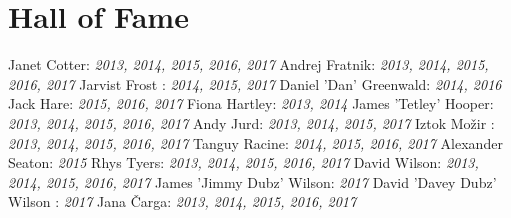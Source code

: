 \section{Hall of Fame} 

Janet Cotter: \textsl{2013, 2014, 2015, 2016, 2017 }
\newline
Andrej Fratnik: \textsl{2013, 2014, 2015, 2016, 2017 }
\newline
Jarvist Frost : \textsl{2014, 2015, 2017 }
\newline
Daniel 'Dan' Greenwald: \textsl{2014, 2016 }
\newline
Jack Hare: \textsl{2015, 2016, 2017 }
\newline
Fiona Hartley: \textsl{2013, 2014 }
\newline
James 'Tetley' Hooper: \textsl{2013, 2014, 2015, 2016, 2017 }
\newline
Andy Jurd: \textsl{2013, 2014, 2015, 2017 }
\newline
Iztok Mo\v{z}ir : \textsl{2013, 2014, 2015, 2016, 2017 }
\newline
Tanguy Racine: \textsl{2014, 2015, 2016, 2017 }
\newline
Alexander Seaton: \textsl{2015 }
\newline
Rhys Tyers: \textsl{2013, 2014, 2015, 2016, 2017 }
\newline
David Wilson: \textsl{2013, 2014, 2015, 2016, 2017 }
\newline
James 'Jimmy Dubz' Wilson: \textsl{2017 }
\newline
David 'Davey Dubz' Wilson : \textsl{2017 }
\newline
Jana \v{C}arga: \textsl{2013, 2014, 2015, 2016, 2017 }
\newline
